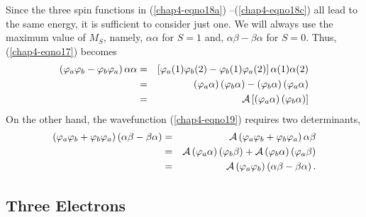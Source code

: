 Since the three spin functions in (\ref{chap4-eqno18a})
--(\ref{chap4-eqno18c}) all lead to the
same energy, it is sufficient to consider just one.  We will always
use the maximum value of $M_S$, namely, $\alpha \alpha$ for $S = 1$
and, $\alpha\beta - \beta\alpha$ for $S = 0$.  Thus,
(\ref{chap4-eqno17}) becomes
\begin{eqnarray}
\left( \varphi_a \varphi_b - \varphi_b \varphi_a \right) \alpha \alpha &=& 
\left[ \varphi_a (1) \varphi_b (2) - \varphi_b (1) \varphi_a (2) \right] 
\alpha ( 1 ) \alpha (2)\cr
&=& \left( \varphi_a \alpha \right) \left( \varphi_b \alpha \right) - 
\left( \varphi_b \alpha \right) \left( \varphi_a \alpha \right)\cr
&=& {\cal A} \left[ \left( \varphi_a \alpha \right) \left( \varphi_b 
\alpha \right) \right]
\end{eqnarray}
On the other hand, the wavefunction (\ref{chap4-eqno19}) requires two
determinants,
\begin{eqnarray}
\left( \varphi_a \varphi_b + \varphi_b \varphi_a \right) \left( \alpha 
\beta - \beta \alpha \right) &=& {\cal A} \left( \varphi_a \varphi_b + 
\varphi_b \varphi_a \right) \alpha \beta\cr
&=&{\cal A} \left( \varphi_a \alpha \right) \left( \varphi_b \beta 
\right) + {\cal A} \left( \varphi_b \alpha \right) \left( \varphi_a \beta 
\right)\cr
&=& {\cal A} \left( \varphi_a \varphi_b \right) \left( \alpha \beta - \beta 
\alpha \right).
\end{eqnarray}

\subsection{Three Electrons}

